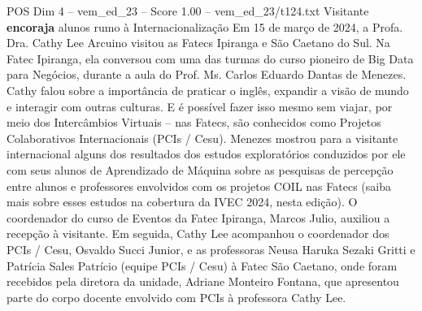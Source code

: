 \begin{textsample}{POS Dim 4 – vem\_ed\_23 – Score 1.00 – vem\_ed\_23/t124.txt}  \label{ex:f4_pos_094}
Visitante \textbf{encoraja} alunos rumo à Internacionalização Em 15 de março de 2024, a Profa.
Dra.
Cathy Lee Arcuino visitou as Fatecs Ipiranga e São Caetano do Sul.
Na Fatec Ipiranga, ela conversou com uma das turmas do curso pioneiro de Big Data para Negócios, durante a aula do Prof.
Ms.
Carlos Eduardo Dantas de Menezes.
Cathy falou sobre a importância de praticar o inglês, expandir a visão de mundo e interagir com outras culturas.
E é possível fazer isso mesmo sem viajar, por meio dos Intercâmbios Virtuais – nas Fatecs, são conhecidos como Projetos Colaborativos Internacionais (PCIs / Cesu).
Menezes mostrou para a visitante internacional alguns dos resultados dos estudos exploratórios conduzidos por ele com seus alunos de Aprendizado de Máquina sobre as pesquisas de percepção entre alunos e professores envolvidos com os projetos COIL nas Fatecs (saiba mais sobre esses estudos na cobertura da IVEC 2024, nesta edição).
O coordenador do curso de Eventos da Fatec Ipiranga, Marcos Julio, auxiliou a recepção à visitante.
Em seguida, Cathy Lee acompanhou o coordenador dos PCIs / Cesu, Osvaldo Succi Junior, e as professoras Neusa Haruka Sezaki Gritti e Patrícia Sales Patrício (equipe PCIs / Cesu) à Fatec São Caetano, onde foram recebidos pela diretora da unidade, Adriane Monteiro Fontana, que apresentou parte do corpo docente envolvido com PCIs à professora Cathy Lee.

\end{textsample}
